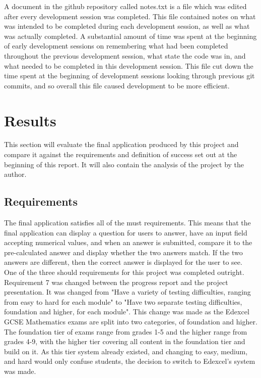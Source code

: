 \documentclass{article}
\begin{document}
A document in the github repository called notes.txt is a file which was edited after every development session was completed. This file contained notes on what was intended to be completed during each development session, as well as what was actually completed. A substantial amount of time was spent at the beginning of early development sessions on remembering what had been completed throughout the previous development session, what state the code was in, and what needed to be completed in this development session. This file cut down the time spent at the beginning of development sessions looking through previous git commits, and so overall this file caused development to be more efficient. \\




\section{Results}
\label{section:results}

This section will evaluate the final application produced by this project and compare it against the requirements and definition of success set out at the beginning of this report. It will also contain the analysis of the project by the author. 

\subsection{Requirements}

The final application satisfies all of the must requirements. This means that the final application can display a question for users to answer, have an input field accepting numerical values, and when an answer is submitted, compare it to the pre-calculated answer and display whether the two answers match. If the two answers are different, then the correct answer is displayed for the user to see. \\

One of the three should requirements for this project was completed outright. Requirement 7 was changed between the progress report and the project presentation. It was changed from "Have a variety of testing difficulties, ranging from easy to hard for each module" to "Have two separate testing difficulties, foundation and higher, for each module". This change was made as the Edexcel GCSE Mathematics exams are split into two categories, of foundation and higher. The foundation tier of exams range from grades 1-5 and the higher range from grades 4-9, with the higher tier covering all content in the foundation tier and build on it. As this tier system already existed, and changing to easy, medium, and hard would only confuse students, the decision to switch to Edexcel's system was made. \\
\end{document}

